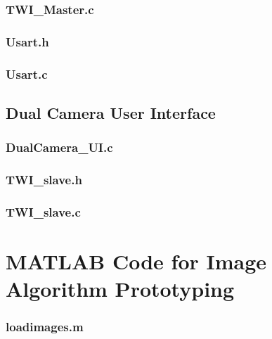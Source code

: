 \subsubsection{TWI\_Master.c}


\subsubsection{Usart.h}


\subsubsection{Usart.c}



\subsection{Dual Camera User Interface}

\subsubsection{DualCamera\_UI.c}


\subsubsection{TWI\_slave.h}


\subsubsection{TWI\_slave.c}


\section{MATLAB Code for Image Algorithm Prototyping}

\subsubsection{loadimages.m}


